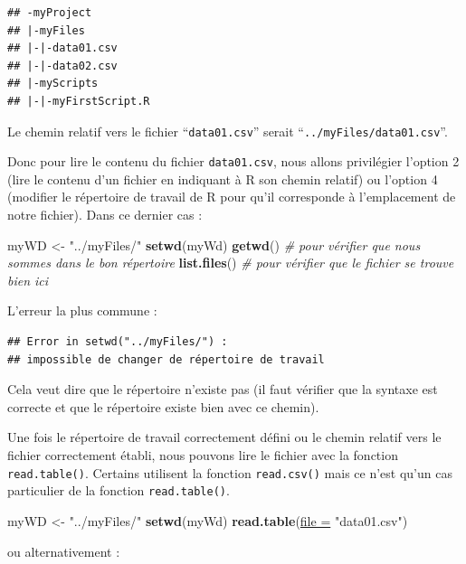 \documentclass[twoside,symmetric]{book}
\newenvironment{Shaded}{}{}
\newcommand{\CommentTok}[1]{\textit{#1}}
\newcommand{\DataTypeTok}[1]{\underline{#1}}
\newcommand{\KeywordTok}[1]{\textbf{#1}}
\newcommand{\NormalTok}[1]{#1}
\newcommand{\StringTok}[1]{#1}
\begin{document}
\begin{verbatim}
## -myProject
## |-myFiles
## |-|-data01.csv
## |-|-data02.csv
## |-myScripts
## |-|-myFirstScript.R
\end{verbatim}

Le chemin relatif vers le fichier ``\texttt{data01.csv}'' serait ``\texttt{../myFiles/data01.csv}''.

Donc pour lire le contenu du fichier \texttt{data01.csv}, nous allons privilégier l'option 2 (lire le contenu d'un fichier en indiquant à R son chemin relatif) ou l'option 4 (modifier le répertoire de travail de R pour qu'il corresponde à l'emplacement de notre fichier). Dans ce dernier cas :

\begin{Shaded}
\begin{Highlighting}[]
\NormalTok{myWD <-}\StringTok{ "../myFiles/"}
\KeywordTok{setwd}\NormalTok{(myWd)}
\KeywordTok{getwd}\NormalTok{() }\CommentTok{# pour vérifier que nous sommes dans le bon répertoire}
\KeywordTok{list.files}\NormalTok{() }\CommentTok{# pour vérifier que le fichier se trouve bien ici}
\end{Highlighting}
\end{Shaded}

L'erreur la plus commune :

\begin{verbatim}
## Error in setwd("../myFiles/") : 
## impossible de changer de répertoire de travail
\end{verbatim}

Cela veut dire que le répertoire n'existe pas (il faut vérifier que la syntaxe est correcte et que le répertoire existe bien avec ce chemin).

Une fois le répertoire de travail correctement défini ou le chemin relatif vers le fichier correctement établi, nous pouvons lire le fichier avec la fonction \texttt{read.table()}. Certains utilisent la fonction \texttt{read.csv()} mais ce n'est qu'un cas particulier de la fonction \texttt{read.table()}.

\begin{Shaded}
\begin{Highlighting}[]
\NormalTok{myWD <-}\StringTok{ "../myFiles/"}
\KeywordTok{setwd}\NormalTok{(myWd)}
\KeywordTok{read.table}\NormalTok{(}\DataTypeTok{file =} \StringTok{"data01.csv"}\NormalTok{)}
\end{Highlighting}
\end{Shaded}

ou alternativement :
\end{document}
